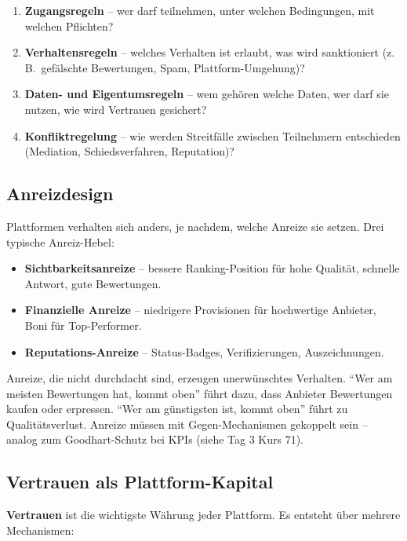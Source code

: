 \documentclass[11pt,a4paper,oneside]{article}
\newcommand{\fachbegriff}[1]{\textbf{#1}}
\begin{document}
\begin{enumerate}
  \item \fachbegriff{Zugangsregeln} -- wer darf teilnehmen, unter welchen Bedingungen, mit welchen Pflichten?
  \item \fachbegriff{Verhaltensregeln} -- welches Verhalten ist erlaubt, was wird sanktioniert (z.\,B.\ gefälschte Bewertungen, Spam, Plattform-Umgehung)?
  \item \fachbegriff{Daten- und Eigentumsregeln} -- wem gehören welche Daten, wer darf sie nutzen, wie wird Vertrauen gesichert?
  \item \fachbegriff{Konfliktregelung} -- wie werden Streitfälle zwischen Teilnehmern entschieden (Mediation, Schiedsverfahren, Reputation)?
\end{enumerate}

\subsection{Anreizdesign}

Plattformen verhalten sich anders, je nachdem, welche Anreize sie setzen. Drei typische Anreiz-Hebel:

\begin{itemize}
  \item \fachbegriff{Sichtbarkeitsanreize} -- bessere Ranking-Position für hohe Qualität, schnelle Antwort, gute Bewertungen.
  \item \fachbegriff{Finanzielle Anreize} -- niedrigere Provisionen für hochwertige Anbieter, Boni für Top-Performer.
  \item \fachbegriff{Reputations-Anreize} -- Status-Badges, Verifizierungen, Auszeichnungen.
\end{itemize}

Anreize, die nicht durchdacht sind, erzeugen unerwünschtes Verhalten. ``Wer am meisten Bewertungen hat, kommt oben'' führt dazu, dass Anbieter Bewertungen kaufen oder erpressen. ``Wer am günstigsten ist, kommt oben'' führt zu Qualitätsverlust. Anreize müssen mit Gegen-Mechanismen gekoppelt sein -- analog zum Goodhart-Schutz bei KPIs (siehe Tag 3 Kurs 71).

\subsection{Vertrauen als Plattform-Kapital}

\fachbegriff{Vertrauen} ist die wichtigste Währung jeder Plattform. Es entsteht über mehrere Mechanismen:
\end{document}
